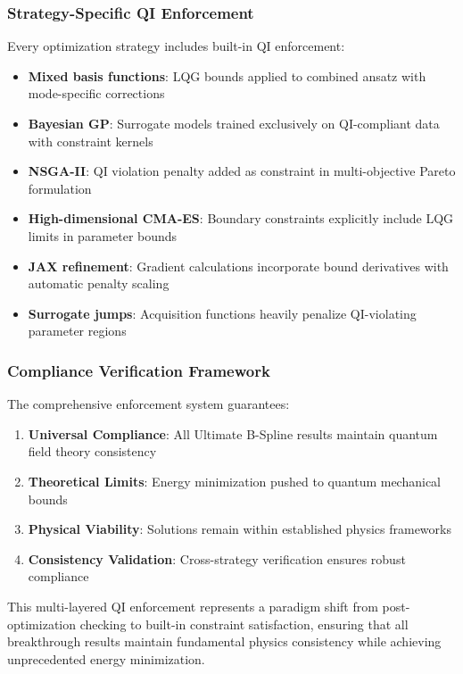 \documentclass[11pt]{article}
\begin{document}
\subsubsection{Strategy-Specific QI Enforcement}

Every optimization strategy includes built-in QI enforcement:

\begin{itemize}
\item \textbf{Mixed basis functions}: LQG bounds applied to combined ansatz with mode-specific corrections
\item \textbf{Bayesian GP}: Surrogate models trained exclusively on QI-compliant data with constraint kernels
\item \textbf{NSGA-II}: QI violation penalty added as constraint in multi-objective Pareto formulation  
\item \textbf{High-dimensional CMA-ES}: Boundary constraints explicitly include LQG limits in parameter bounds
\item \textbf{JAX refinement}: Gradient calculations incorporate bound derivatives with automatic penalty scaling
\item \textbf{Surrogate jumps}: Acquisition functions heavily penalize QI-violating parameter regions
\end{itemize}

\subsubsection{Compliance Verification Framework}

The comprehensive enforcement system guarantees:
\begin{enumerate}
\item \textbf{Universal Compliance}: All Ultimate B-Spline results maintain quantum field theory consistency
\item \textbf{Theoretical Limits}: Energy minimization pushed to quantum mechanical bounds
\item \textbf{Physical Viability}: Solutions remain within established physics frameworks
\item \textbf{Consistency Validation}: Cross-strategy verification ensures robust compliance
\end{enumerate}

This multi-layered QI enforcement represents a paradigm shift from post-optimization checking to built-in constraint satisfaction, ensuring that all breakthrough results maintain fundamental physics consistency while achieving unprecedented energy minimization.
\end{document}
